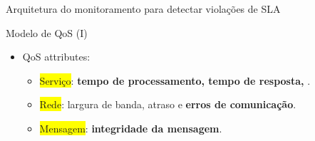 \documentclass[xcolor=svgnames]{beamer}
\begin{document}
\begin{frame}{Arquitetura do monitoramento para detectar violações de SLA}
    \end{frame}

  \begin{frame}{ Modelo de QoS  (I)}
    \begin{itemize} %
	\item QoS attributes:
	    \begin{itemize}
	      \item <2->\colorbox{yellow}{Serviço}: \textbf{tempo de processamento, tempo de resposta, }.
	      \item <3->\colorbox{yellow}{Rede}: largura de banda, atraso e \textbf{erros de comunicação}.
	      \item <4->\colorbox{yellow}{Mensagem}: \textbf{integridade da mensagem}.
	    \end{itemize}
    \end{itemize}
  \end{frame}
\end{document}
